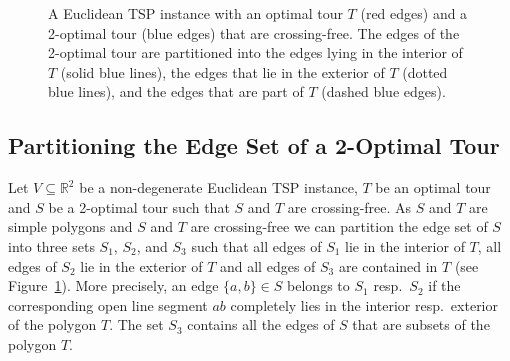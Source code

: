 \documentclass[a4paper, 11pt]{article}
\begin{document}
\begin{figure}[t]
\caption{A Euclidean TSP instance with an optimal tour $T$ (red edges) and a 2-optimal tour 
(blue edges) that are crossing-free. The edges of the 2-optimal tour are partitioned into the 
edges lying in the interior of $T$ (solid blue lines), the edges that lie in the exterior of $T$
(dotted blue lines), and the edges that are part of $T$ (dashed blue edges).} 
\label{fig:crossingfreetours}
\end{figure}



\subsection{Partitioning the Edge Set of a 2-Optimal Tour}
\label{sec:edge-partition}


Let $V \subseteq\mathbb{R}^2$ be a non-degenerate Euclidean TSP instance, $T$ be an optimal tour and $S$ be a 2-optimal tour such that
$S$ and $T$ are crossing-free. As $S$ and $T$ are simple polygons and $S$ and $T$ are crossing-free we can partition the edge set of $S$
into three sets $S_1$, $S_2$, and $S_3$ such that all edges of $S_1$ lie in the interior of $T$, all edges of $S_2$ lie in the exterior of $T$
and all edges of $S_3$ are contained in $T$ (see Figure~\ref{fig:crossingfreetours}). 
More precisely, an edge $\{a, b\} \in S$ belongs to $S_1$ resp.\ $S_2$ if the corresponding open line segment $ab$ completely
lies in the interior resp.\ exterior of the polygon $T$. The set $S_3$ contains all the edges of $S$ that are subsets 
of the polygon $T$.  
\end{document}
